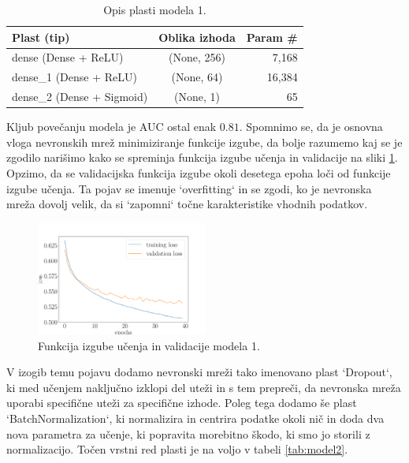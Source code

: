 \documentclass{article}
\begin{document}
\begin{table}[H]
\centering
\begin{tabular}{|l|c|r|}
\hline
\textbf{Plast (tip)}       & \textbf{Oblika izhoda} & \textbf{Param \#} \\
\hline
dense (Dense + ReLU)       & (None, 256)            & 7,168             \\
dense\_1 (Dense + ReLU)    & (None, 64)             & 16,384            \\
dense\_2 (Dense + Sigmoid) & (None, 1)              & 65                \\
\hline
\end{tabular}
\caption{Opis plasti modela 1.}
\label{tab:model1}
\end{table}
Kljub povečanju modela je AUC ostal enak $0.81$. Spomnimo se, da je osnovna vloga nevronskih mrež minimiziranje funkcije izgube, da bolje razumemo kaj se je zgodilo narišimo kako se spreminja funkcija izgube učenja in validacije na sliki \ref{fig:overfitting}. Opzimo, da se validacijska funkcija izgube okoli desetega epoha loči od funkcije izgube učenja. Ta pojav se imenuje `overfitting` in se zgodi, ko je nevronska mreža dovolj velik, da si `zapomni` točne karakteristike vhodnih podatkov.	
\begin{figure}[H]
\centering
	\includegraphics[width=0.5\textwidth]{images/overfittingloss.pdf}
	\caption{Funkcija izgube učenja in validacije modela 1.}
	\label{fig:overfitting}
\end{figure}
V izogib temu pojavu dodamo nevronski mreži tako imenovano plast `Dropout`, ki med učenjem naključno izklopi del uteži in s tem prepreči, da nevronska mreža uporabi specifične uteži za specifične izhode. Poleg tega dodamo še plast `BatchNormalization`, ki normalizira in centrira podatke okoli nič in doda dva nova parametra za učenje, ki popravita morebitno škodo, ki smo jo storili z normalizacijo. Točen vrstni red plasti je na voljo v tabeli \ref{tab:model2}. 
\end{document}
